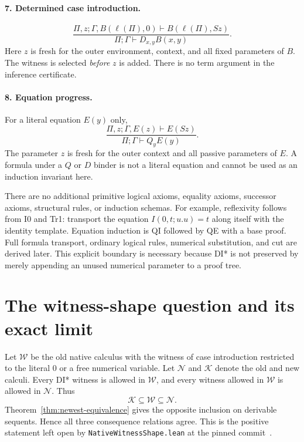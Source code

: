 \documentclass[11pt]{article}
\theoremstyle{definition}
\theoremstyle{remark}
\begin{document}
\paragraph{7. Determined case introduction.}
\[
 \boxed{
 \frac{\Pi,z;\Gamma,B(\ell(\Pi),0)\vdash B(\ell(\Pi),Sz)}
      {\Pi;\Gamma\vdash D_{x,y}B(x,y)}.}
 \tag{DI*}\label{eq:di-star}
\]
Here $z$ is fresh for the outer environment, context, and all fixed
parameters of $B$. The witness is selected \emph{before} $z$ is added.
There is no term argument in the inference certificate.

\paragraph{8. Equation progress.}
For a literal equation $E(y)$ only,
\[
 \frac{\Pi,z;\Gamma,E(z)\vdash E(Sz)}
      {\Pi;\Gamma\vdash Q_yE(y)}.
 \tag{QI}
\]
The parameter $z$ is fresh for the outer context and all passive
parameters of $E$. A formula under a $Q$ or $D$ binder is not a literal
equation and cannot be used as an induction invariant here.

There are no additional primitive logical axioms, equality axioms,
successor axioms, structural rules, or induction schemas. For example,
reflexivity follows from I0 and Tr1: transport the equation
$I(0,t;u.u)=t$ along itself with the identity template.
Equation induction is QI followed by QE with a base proof. Full formula
transport, ordinary logical rules, numerical substitution, and cut are
derived later. This explicit boundary is necessary because DI* is not
preserved by merely appending an unused numerical parameter to a proof
tree.



\section{The witness-shape question and its exact limit}

Let $\mathcal W$ be the old native calculus with the witness of case
introduction restricted to the literal $0$ or a free numerical variable.
Let $\mathcal N$ and $\mathcal K$ denote the old and new calculi.
Every DI* witness is allowed in $\mathcal W$, and every witness allowed
in $\mathcal W$ is allowed in $\mathcal N$. Thus
\[
 \mathcal K\subseteq\mathcal W\subseteq\mathcal N.
\]
Theorem~\ref{thm:newest-equivalence} gives the opposite inclusion on
derivable sequents. Hence all three consequence relations agree. This is
the positive statement left open by \texttt{NativeWitnessShape.lean}
at the pinned commit~\cite{witnessshape}.
\end{document}
